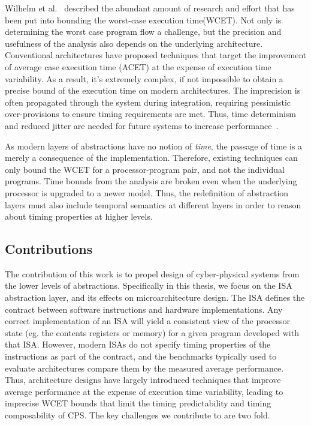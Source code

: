 Wilhelm et al.~\cite{Wilhelm2008survey} described the abundant amount of research and effort that has been put into bounding the worst-case execution time(WCET).   
Not only is determining the worst case program flow a challenge, but the precision and usefulness of the analysis also depends on the underlying architecture\cite{Heckmann2003processor}. 
Conventional architectures have proposed techniques that target the improvement of average case execution time (ACET) at the expense of execution time variability.    
As a result, it's extremely complex, if not impossible to obtain a precise bound of the execution time on modern architectures.
The imprecision is often propagated through the system during integration, requiring pessimistic over-provisions to ensure timing requirements are met.     
Thus, time determinism and reduced jitter are needed for future systems to increase performance~\cite{Sangiovanni-Vincentelli2007automotive}.    

As modern layers of abstractions have no notion of \emph{time}, the passage of time is a merely a consequence of the implementation.  
Therefore, existing techniques can only bound the WCET for a processor-program pair, and not the individual programs.
Time bounds from the analysis are broken even when the underlying processor is upgraded to a newer model.
Thus, the redefinition of abstraction layers must also include temporal semantics at different layers in order to reason about timing properties at higher levels.  

\subsection{Contributions}
The contribution of this work is to propel design of cyber-physical systems from the lower levels of abstractions. 
Specifically in this thesis, we focus on the ISA abstraction layer, and its effects on microarchitecture design. 
The ISA defines the contract between software instructions and hardware implementations.
Any correct implementation of an ISA will yield a consistent view of the processor state (eg. the contents registers or memory) for a given program developed with that ISA.     
However, modern ISAs do not specify timing properties of the instructions as part of the contract, and the benchmarks typically used to evaluate architectures compare them by the measured average performance.   
Thus, architecture designs have largely introduced techniques that improve average performance at the expense of execution time variability, leading to imprecise WCET bounds that limit the timing predictability and timing composability of CPS.
The key challenges we contribute to are two fold.

